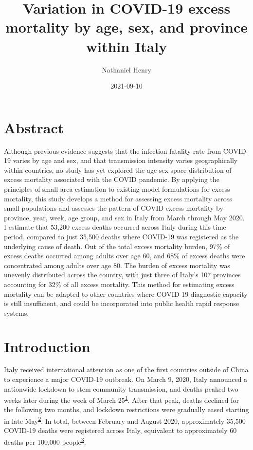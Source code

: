 \documentclass[
]{article}
\title{Variation in COVID-19 excess mortality by age, sex, and province within Italy}
\author{Nathaniel Henry\textsuperscript{}}
\date{2021-09-10}
\begin{document}
\maketitle

\hypertarget{abstract}{%
\section{Abstract}\label{abstract}}

Although previous evidence suggests that the infection fatality rate from COVID-19 varies by age and sex, and that transmission intensity varies geographically within countries, no study has yet explored the age-sex-space distribution of excess mortality associated with the COVID pandemic. By applying the principles of small-area estimation to existing model formulations for excess mortality, this study develops a method for assessing excess mortality across small populations and assesses the pattern of COVID excess mortality by province, year, week, age group, and sex in Italy from March through May 2020. I estimate that 53,200 excess deaths occurred across Italy during this time period, compared to just 35,500 deaths where COVID-19 was registered as the underlying cause of death. Out of the total excess mortality burden, 97\% of excess deaths occurred among adults over age 60, and 68\% of excess deaths were concentrated among adults over age 80. The burden of excess mortality was unevenly distributed across the country, with just three of Italy's 107 provinces accounting for 32\% of all excess mortality. This method for estimating excess mortality can be adapted to other countries where COVID-19 diagnostic capacity is still insufficient, and could be incorporated into public health rapid response systems.

\hypertarget{introduction}{%
\section{Introduction}\label{introduction}}

Italy received international attention as one of the first countries outside of China to experience a major COVID-19 outbreak. On March 9, 2020, Italy announced a nationwide lockdown to stem community transmission, and deaths peaked two weeks later during the week of March 25\textsuperscript{\protect\hyperlink{ref-Sebastiani2020}{1}}⁠. After that peak, deaths declined for the following two months, and lockdown restrictions were gradually eased starting in late May\textsuperscript{\protect\hyperlink{ref-Alicandro2020}{2}}⁠. In total, between February and August 2020, approximately 35,500 COVID-19 deaths were registered across Italy, equivalent to approximately 60 deaths per 100,000 people\textsuperscript{\protect\hyperlink{ref-InstituteforHealthMetricsandEvaluationIHME2020}{3}}.
\end{document}
